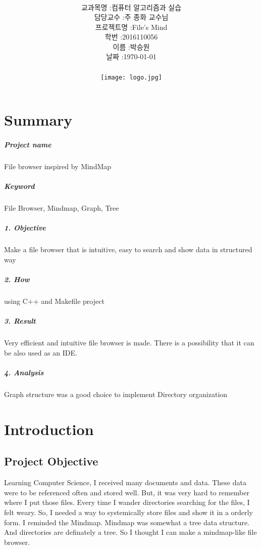 \documentclass[12pt,a4paper]{report}
\title{
	\centering
	\pgfornament[width=12cm,color=teal]{84}\\
	\vspace{1cm}
	\fontsize{50}{50} \selectfont {File Browsesr\\inspired by MindMap}\\
		\pgfornament[width=12cm,color=teal]{88}\\
	\vfill}
\author{
	\LARGE
	\begin{tabular}{rl}
		\hline
		교과목명 : & 컴퓨터 알고리즘과 실습\\
		담당교수 : & 주 종화 교수님\\
		프로젝트명 : & File's Mind\\
		학번 : & 2016110056\\ 
		이름 : & 박승원\\
		날짜 : & \today\\
		\hline
	\end{tabular}\vspace{1cm}
	\\
\texttt{[image: logo.jpg]}
	}
\date{}
\begin{document}
\maketitle


\newpage
\tableofcontents
\newpage
\chapter*{Summary}
\paragraph{Project name} File browser inspired by MindMap\\ 
\paragraph{Keyword} File Browser, Mindmap, Graph, Tree\\
\paragraph{1. Objective} Make a file browser that is intuitive, easy to search and show data in structured way\\
\paragraph{2. How} using C++ and Makefile project\\
\paragraph{3. Result} Very efficient and intuitive file browser is made. There is a possibility that it can be also used as an IDE.
\paragraph{4. Analysis} Graph structure was a good choice to implement Directory organization\\

\noindent
\chapter{Introduction}
\section{Project Objective}
Learning Computer Science, I received many documents and data. These data were to be referenced often
and stored well. But, it was very hard to remember where I put those files. Every time I wander directories
searching for the files, I felt weary. So, I needed a way to systemically store files and show it in a orderly form.
I reminded the Mindmap. Mindmap was somewhat a tree data structure. And directories are definately a
tree. So I thought I can make a mindmap-like file browser.
\end{document}
